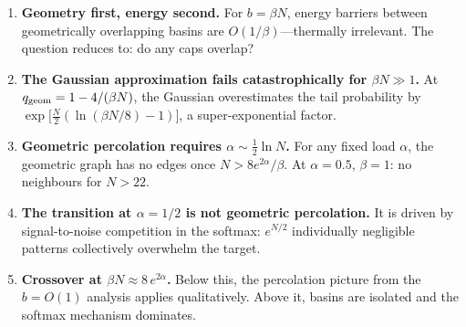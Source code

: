 \documentclass[11pt]{article}
\begin{document}
\begin{enumerate}
  \item \textbf{Geometry first, energy second.}
    For $b = \beta N$, energy barriers between geometrically
    overlapping basins are $O(1/\beta)$---thermally irrelevant.
    The question reduces to: do any caps overlap?

  \item \textbf{The Gaussian approximation fails catastrophically
    for $\beta N \gg 1$.}
    At $q_{\rm geom} = 1 - 4/(\beta N)$,
    the Gaussian overestimates the tail probability by
    $\exp\!\bigl[\tfrac{N}{2}(\ln(\beta N/8) - 1)\bigr]$,
    a super-exponential factor.

  \item \textbf{Geometric percolation requires
    $\alpha \sim \tfrac{1}{2}\ln N$.}
    For any fixed load $\alpha$, the geometric graph has
    no edges once $N > 8e^{2\alpha}/\beta$.
    At $\alpha = 0.5$, $\beta = 1$: no neighbours for $N > 22$.

  \item \textbf{The transition at $\alpha = 1/2$ is not
    geometric percolation.}
    It is driven by signal-to-noise competition in the softmax:
    $e^{N/2}$ individually negligible patterns collectively
    overwhelm the target.

  \item \textbf{Crossover at $\beta N \approx 8\,e^{2\alpha}$.}
    Below this, the percolation picture from the $b = O(1)$
    analysis applies qualitatively.
    Above it, basins are isolated and the softmax mechanism
    dominates.
\end{enumerate}
\end{document}
